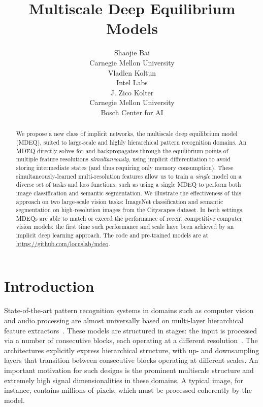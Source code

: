 \documentclass{article}
\title{Multiscale Deep Equilibrium Models}
\author{Shaojie Bai \\
  Carnegie Mellon University \\
\And
  Vladlen Koltun \\
  Intel Labs \\
  \And
  J. Zico Kolter \\
  Carnegie Mellon University \\
  Bosch Center for AI \\
}
\begin{document}
\maketitle

\begin{abstract}
  We propose a new class of implicit networks, the multiscale deep equilibrium model (MDEQ), suited to large-scale and highly hierarchical pattern recognition domains. An MDEQ directly solves for and backpropagates through the equilibrium points of multiple feature resolutions \emph{simultaneously}, using implicit differentiation to avoid storing intermediate states (and thus requiring only  memory consumption). These simultaneously-learned multi-resolution features allow us to train a \emph{single} model on a diverse set of tasks and loss functions, such as using a single MDEQ to perform both image classification and semantic segmentation. We illustrate the effectiveness of this approach on two large-scale vision tasks: ImageNet classification and semantic segmentation on high-resolution images from the Cityscapes dataset. In both settings, MDEQs are able to match or exceed the performance of recent competitive computer vision models: the first time such performance and scale have been achieved by an implicit deep learning approach. The code and pre-trained models are at \url{https://github.com/locuslab/mdeq}.
\end{abstract}

\section{Introduction}
\label{sec:intro}

State-of-the-art pattern recognition systems in domains such as computer vision and audio processing are almost universally based on multi-layer hierarchical feature extractors~\cite{LeCun1989,lee2009convolutional,lee2009unsupervised}. These models are structured in stages: the input is processed via a number of consecutive blocks, each operating at a different resolution~\cite{krizhevsky2012imagenet,szegedy2015going,simonyan2015very,he2016deep}. The architectures explicitly express hierarchical structure, with up- and downsampling layers that transition between consecutive blocks operating at different scales. An important motivation for such designs is the prominent multiscale structure and extremely high signal dimensionalities in these domains. A typical image, for instance, contains millions of pixels, which must be processed coherently by the model.
\end{document}
